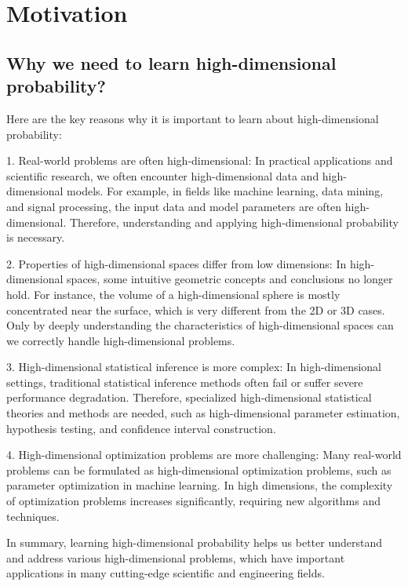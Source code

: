 \chapter{Motivation}

\section{Why we need to learn high-dimensional probability?}

Here are the key reasons why it is important to learn about high-dimensional probability:

1. Real-world problems are often high-dimensional: In practical applications and scientific research, we often encounter high-dimensional data and high-dimensional models. 
For example, in fields like machine learning, data mining, and signal processing, the input data and model parameters are often high-dimensional. Therefore, understanding and applying high-dimensional probability is necessary.

2. Properties of high-dimensional spaces differ from low dimensions: 
In high-dimensional spaces, some intuitive geometric concepts and conclusions no longer hold. 
For instance, the volume of a high-dimensional sphere is mostly concentrated near the surface, 
which is very different from the 2D or 3D cases. Only by deeply understanding the characteristics of high-dimensional spaces can we correctly handle high-dimensional problems.

3. High-dimensional statistical inference is more complex: In high-dimensional settings, traditional statistical inference methods often fail or suffer severe performance degradation. 
Therefore, specialized high-dimensional statistical theories and methods are needed, such as high-dimensional parameter estimation, hypothesis testing, and confidence interval construction.

4. High-dimensional optimization problems are more challenging: Many real-world problems can be formulated as high-dimensional optimization problems, such as parameter optimization in machine learning. 
In high dimensions, the complexity of optimization problems increases significantly, requiring new algorithms and techniques.

In summary, learning high-dimensional probability helps us better understand and address various high-dimensional problems, 
which have important applications in many cutting-edge scientific and engineering fields.